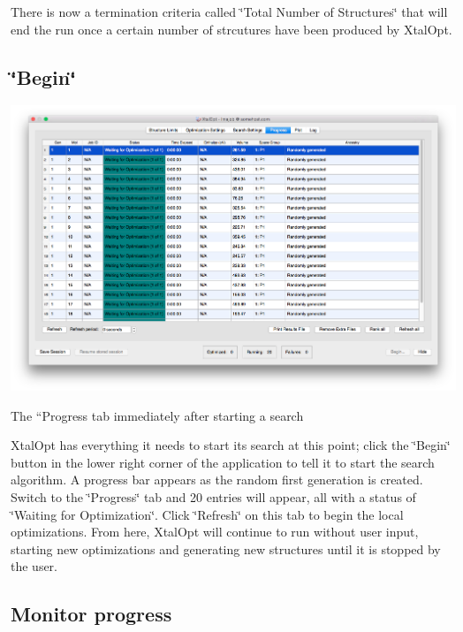 There is now a termination criteria called \char`\"{}\+Total Number of Structures\char`\"{} that will end the run once a certain number of strcutures have been produced by Xtal\+Opt.\hypertarget{tut-xo_begin}{}\subsection{\char`\"{}\+Begin\char`\"{}}\label{tut-xo_begin}

\begin{DoxyImage}
\includegraphics[width=\textwidth]{prog-start.png}
\caption{The ``\+Progress\textquotesingle{}\textquotesingle{} tab immediately after starting a search}
\end{DoxyImage}


Xtal\+Opt has everything it needs to start its search at this point; click the \char`\"{}\+Begin\char`\"{} button in the lower right corner of the application to tell it to start the search algorithm. A progress bar appears as the random first generation is created. Switch to the \char`\"{}\+Progress\char`\"{} tab and 20 entries will appear, all with a status of \char`\"{}\+Waiting for
\+Optimization\char`\"{}. Click \char`\"{}\+Refresh\char`\"{} on this tab to begin the local optimizations. From here, Xtal\+Opt will continue to run without user input, starting new optimizations and generating new structures until it is stopped by the user.\hypertarget{tut-xo_prog-mon}{}\subsection{Monitor progress}\label{tut-xo_prog-mon}


